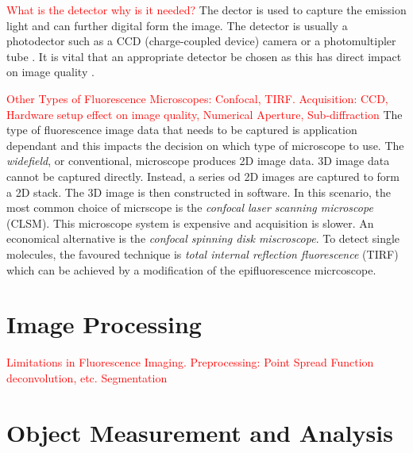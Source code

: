 \begin{definition}[Detector]
	\textcolor{red}{What is the detector why is it needed?}
	The dector is used to capture the emission light and can further digital form the image.
	The detector is usually a photodector such as a CCD (charge-coupled device) camera or a photomultipler tube \citep{Danek2012,Hubeny2008,LichtmanConchello2005,Spring2003,Murphy2001}.
	It is vital that an appropriate detector be chosen as this has direct impact on image quality \citep{Fatima2008}.
\end{definition}

\textcolor{red}{Other Types of Fluorescence Microscopes: Confocal, TIRF. Acquisition: CCD, Hardware setup effect on image quality, Numerical Aperture, Sub-diffraction}
The type of fluorescence image data that needs to be captured is application dependant and this impacts the decision on which type of microscope to use.
The \textit{widefield}, or conventional, microscope produces 2D image data.
3D image data cannot be captured directly.
Instead, a series od 2D images are captured to form a 2D stack. The 3D image is then constructed in software.
In this scenario, the most common choice of micrscope is the \textit{confocal laser scanning microscope} (CLSM).
This microscope system is expensive and acquisition is slower.
An economical alternative is the \textit{confocal spinning disk miscroscope}.
To detect single molecules, the favoured technique is \textit{total internal reflection fluorescence} (TIRF) which can be achieved by a modification of the epifluorescence micrcoscope.


\section{Image Processing}
\label{sec:ImageProcessing}

\textcolor{red}{Limitations in Fluorescence Imaging. Preprocessing: Point Spread Function deconvolution, etc. Segmentation }



\section{Object Measurement and Analysis}
\label{sec:Measurements}


